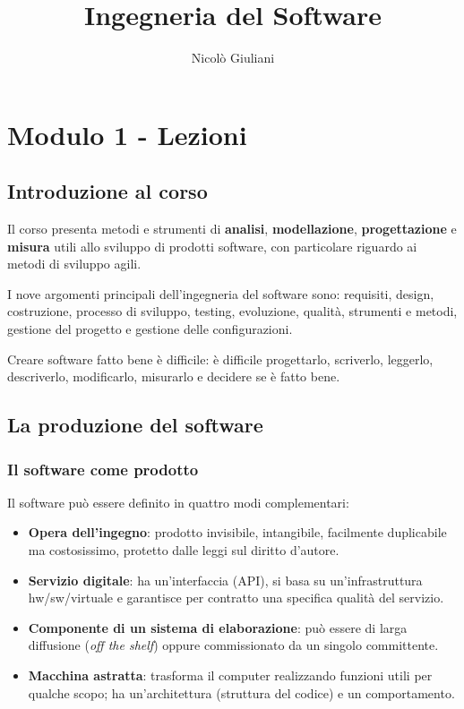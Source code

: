 \documentclass[a4paper,12pt]{article}
\title{Ingegneria del Software}
\author{Nicolò Giuliani}
\date{}
\begin{document}
\maketitle
\tableofcontents   %
\newpage

\section{Modulo 1 - Lezioni}
\subsection{Introduzione al corso}

Il corso presenta metodi e strumenti di \textbf{analisi}, \textbf{modellazione},
\textbf{progettazione} e \textbf{misura} utili allo sviluppo di prodotti software,
con particolare riguardo ai metodi di sviluppo agili.

I nove argomenti principali dell'ingegneria del software sono: requisiti, design,
costruzione, processo di sviluppo, testing, evoluzione, qualità, strumenti e metodi,
gestione del progetto e gestione delle configurazioni.

Creare software fatto bene è difficile: è difficile progettarlo, scriverlo, leggerlo,
descriverlo, modificarlo, misurarlo e decidere se è fatto bene.

\subsection{La produzione del software}

\subsubsection{Il software come prodotto}

Il software può essere definito in quattro modi complementari:
\begin{itemize}
  \item \textbf{Opera dell'ingegno}: prodotto invisibile, intangibile, facilmente
        duplicabile ma costosissimo, protetto dalle leggi sul diritto d'autore.
  \item \textbf{Servizio digitale}: ha un'interfaccia (API), si basa su
        un'infrastruttura hw/sw/virtuale e garantisce per contratto una specifica
        qualità del servizio.
  \item \textbf{Componente di un sistema di elaborazione}: può essere di larga
        diffusione (\emph{off the shelf}) oppure commissionato da un singolo committente.
  \item \textbf{Macchina astratta}: trasforma il computer realizzando funzioni utili
        per qualche scopo; ha un'architettura (struttura del codice) e un comportamento.
\end{itemize}
\end{document}
